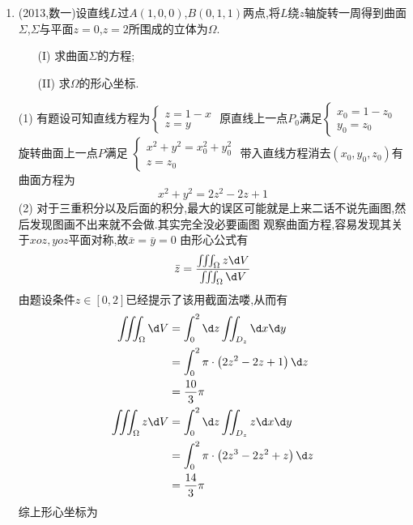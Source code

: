 \documentclass[12pt, a4paper, oneside, UTF8]{ctexbook}
\begin{document}
\begin{enumerate}[label=\arabic*.]
    \item (2013,数一)设直线$L$过$A(1,0,0)$,$B(0,1,1)$两点,将$L$绕$z$轴旋转一周得到曲面$\Sigma$,$\Sigma$与平面$z=0$,$z=2$所围成的立体为$\Omega$.
    \begin{enumerate}
        \item[(I)] 求曲面$\Sigma$的方程;
        \item[(II)] 求$\Omega$的形心坐标.
    \end{enumerate}
    
    \begin{solution}
    (1) 有题设可知直线方程为$\begin{cases}
        z = 1 - x \\
        z = y
    \end{cases}$ 原直线上一点$P_0$满足$\begin{cases}
        x_0 = 1 - z_0 \\
        y_0 = z_0 
    \end{cases}$ 旋转曲面上一点$P$满足 $\begin{cases}
        x^2+y^2=x^2_0+y^2_0 \\
        z=z_0
    \end{cases}$ 带入直线方程消去$(x_0,y_0,z_0)$有曲面方程为
    $$
    x^2+y^2=2z^2-2z+1
    $$
    (2) 对于三重积分以及后面的积分,最大的误区可能就是上来二话不说先画图,然后发现图画不出来就不会做.其实完全没必要画图
    观察曲面方程,容易发现其关于$xoz,yoz$平面对称,故$\bar{x}=\bar{y}=0$ 由形心公式有
    $$
    \bar{z} = \frac{\iiint_{\Omega}z\d V}{\iiint_{\Omega}\d V}
    $$
    由题设条件$z\in[0,2]$已经提示了该用截面法喽,从而有
    \begin{align*}
        \iiint_{\Omega}\d V &= \int_{0}^{2}\d z\iint_{D_z}\d x\d y \\
        &= \int_{0}^{2}\pi\cdot\left(2z^2-2z+1\right)\d z \\
        &=\frac{10}{3}\pi \\
        \iiint_{\Omega}z\d V &= \int_{0}^{2}\d z\iint_{D_z} z\d x\d y \\
        &= \int_{0}^{2}\pi\cdot\left(2z^3-2z^2+z\right)\d z \\
        &= \frac{14}{3}\pi
    \end{align*}
    综上形心坐标为
    \begin{center}
    \end{center}
    \end{solution}
    

\end{enumerate}
\end{document}
